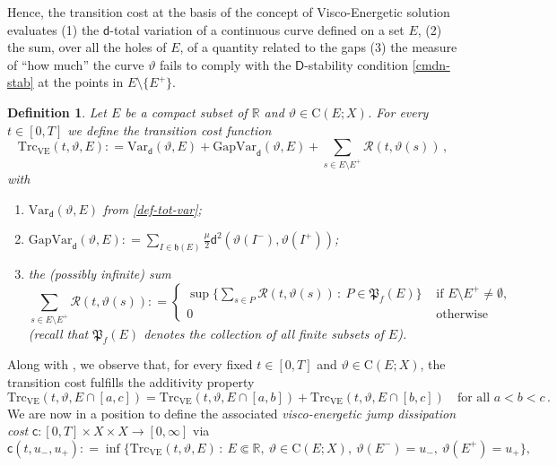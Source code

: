 \documentclass[a4paper,10pt,reqno]{amsart} %
\newcommand{\R}{\mathbb{R}}
\newtheorem{definition}[theorem]{Definition}
\numberwithin{equation}{section}
\newcommand{\teta}{\vartheta}
\newcommand{\Xs}{X}
\newcommand{\mdn}{\mathsf{d}}
\newcommand{\cmdn}{\mathsf{D}}
\newcommand{\Vars}[3]{\mathrm{Var}_{#1}(#2,#3)}
\newcommand{\vecostname}{\mathsf{c}}
\newcommand{\vecost}[3]{\mathsf{c}(#1,#2,#3)}
\newcommand{\VE}{\mathrm{VE}}
\newcommand{\rstab}[2]{\mathcal{R}(#1,#2)}
\newcommand{\hole}[1]{\mathfrak{h}(#1)}
\newcommand{\tcost}[4]{\mathrm{Trc}_{#1}(#2,#3,#4)}
\newcommand{\Gap}[3]{\mathrm{GapVar}_{#1}(#2,#3)}
\newcommand{\RRR}{\color{red}}
\newcommand{\EEE}{\color{black}}
\begin{document}
Hence, the transition cost at the basis of the concept of Visco-Energetic solution evaluates 
(1)  the  $\mdn$-total variation of a continuous curve defined on a set $E$, (2) the sum, over all the holes of $E$, of a quantity  related to the gaps 
(3)  the measure of ``how much''  the curve $\teta$ fails to comply with the $\cmdn$-stability condition \eqref{cmdn-stab} at the points in $E \setminus \{E^+\}$.
\begin{definition}
\label{def-VE-trans-cost}
Let $E$ be a compact subset of $\R$ and $\teta \in \mathrm{C}(E;\Xs)$. For every $t\in [0,T]$ we define the \emph{transition cost function} 
\begin{equation}
\label{ve-tcost}
\tcost{\VE}{t}{\teta}{E} : = \Vars {\mdn}\teta E + \Gap{\mdn}\teta E  + \sum_{s\in E{\setminus}E^+} \rstab t{\teta(s)}\,,
\end{equation}
with
\begin{enumerate}
\item $ \Vars {\mdn}\teta E $ from \eqref{def-tot-var};
\item $\Gap{\mdn}\teta E: = \sum_{I\in \hole E} \frac\mu2 \mdn^2(\teta(I^-),\teta(I^+))$;
\item the (possibly infinite) sum
\[
 \sum_{s\in E{\setminus}E^+} \rstab t{\teta(s)}: =  \begin{cases}
 \sup \{  \sum_{s\in P} \rstab t{\teta(s)}\, :  \ P \in \mathfrak{P}_f(E) \} &\text{ if }  E{\setminus}E^+ \neq \emptyset,
 \\
 0 &\text{ otherwise}
 \end{cases}
\]
(recall that $ \mathfrak{P}_f(E)$ denotes the collection of all finite subsets of $E$).
\end{enumerate}
\end{definition}
Along with \cite{SavMin16}, we observe that, for every fixed $t\in [0,T]$ and $\teta \in \mathrm{C}(E;\Xs)$, the transition cost fulfills the additivity property
\[
\tcost{\VE}{t}{\teta}{E \cap [a,c]} = \tcost{\VE}{t}{\teta}{E \cap [a,b]} + \tcost{\VE}{t}{\teta}{E \cap [b,c]}  \quad \text{for all } a<b<c\,.
\]
We are now in a position to define the associated \emph{visco-energetic jump dissipation cost} $\vecostname: [0,T]\times X \times X \to [0,\infty]$ via
 \begin{equation}
 \label{vecost}
  \vecost t{u_-}{u_+}: = \inf\{ \tcost{\VE}{t}{\teta}{E}\, : \ E \Subset \R, \ \teta \in \mathrm{C}(E;\Xs), \ \teta(E^-) =u_-, \  \teta(E^+) =u_+ \},
\end{equation}
\end{document}
